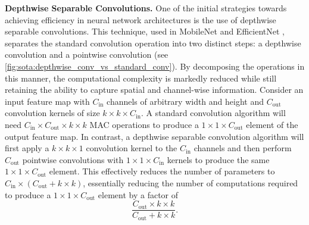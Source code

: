 \textbf{Depthwise Separable Convolutions.} One of the initial strategies towards
achieving efficiency in neural network architectures is the use of depthwise
separable convolutions. This technique, used in MobileNet
\cite{howard2017mobilenets} and EfficientNet \cite{DBLP:conf/icml/TanL19},
separates the standard convolution operation into two distinct steps: a
depthwise convolution and a pointwise convolution (see
\cref{fig:sota:depthwise_conv_vs_standard_conv}). By decomposing the operations
in this manner, the computational complexity is markedly reduced while still
retaining the ability to capture spatial and channel-wise information. Consider
an input feature map with $C_\text{in}$ channels of arbitrary width and height
and $C_\text{out}$ convolution kernels of size $k\times k \times C_\text{in}$. A
standard convolution algorithm will need $C_\text{in} \times C_\text{out} \times
  k \times k$ \ac{MAC} operations to produce a $1 \times 1 \times C_\text{out}$
element of the output feature map. In contrast, a depthwise separable
convolution algorithm will first apply a $k\times k \times 1$ convolution kernel
to the $C_\text{in}$ channels and then perform $C_\text{out}$ pointwise
convolutions with $1\times 1 \times C_\text{in}$ kernels to produce the same
$1\times 1 \times C_\text{out}$ element. This effectively reduces the number of
parameters to $C_\text{in} \times (C_\text{out} + k \times k)$, essentially
reducing the number of computations required to produce a $1 \times 1 \times
  C_\text{out}$ element by a factor of\\

$$\displaystyle\frac{C_\text{out}\times k \times k}{C_\text{out} + k \times k}.$$\\

